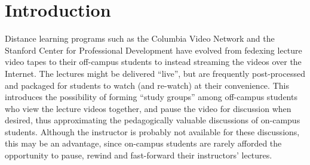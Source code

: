 \documentclass{sig-alternate}
\begin{document}








\section{Introduction}



Distance learning programs such as the Columbia Video Network and the
Stanford Center for Professional Development have evolved from
fedexing lecture video tapes to their off-campus students to instead
streaming the videos over the Internet.  The lectures might be
delivered ``live'', but are frequently post-processed and packaged for
students to watch (and re-watch) at their convenience.  This
introduces the possibility of forming ``study groups'' among
off-campus students who view the lecture videos together, and pause
the video for discussion when desired, thus approximating the
pedagogically valuable discussions of on-campus students.  Although
the instructor is probably not available for these discussions, this
may be an advantage, since on-campus students are rarely afforded the
opportunity to pause, rewind and fast-forward their instructors'
lectures.
\end{document}
